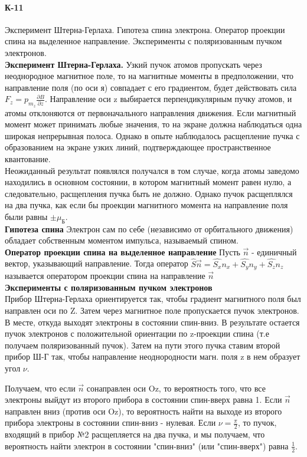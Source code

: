 \documentclass[__main__.tex]{subfiles}
\begin{document}
\paragraph{К-11} Эксперимент Штерна-Герлаха. Гипотеза спина электрона. Оператор проекции спина на выделенное направление. Эксперименты с поляризованным пучком электронов.\\

\textbf{Эксперимент Штерна-Герлаха.} Узкий пучок атомов пропускать через неоднородное магнитное поле, то на магнитные моменты в предположении, что направление поля (по оси я) совпадает с его градиентом, будет действовать сила $F_z = p_{m_z}\frac{\partial B}{\partial z}$. Направление оси z выбирается перпендикулярным пучку атомов, и атомы отклоняются от первоначального направления движения. Если магнитный момент может принимать любые значения, то на экране должна наблюдаться одна широкая непрерывная полоса. Однако в опыте наблюдалось расщепление пучка с образованием на экране узких линий, подтверждающее пространственное квантование. \\

Неожиданный результат появлялся получался в том случае, когда атомы заведомо находились в основном состоянии, в котором магнитный момент равен нулю, а следовательно, расщепления пучка быть не должно. Однако пучок расщеплялся на два пучка, как если бы проекции магнитного момента на направление поля были равны $\pm \mu_{Б}$. \\

\textbf{Гипотеза спина} Электрон сам по себе (независимо от орбитального движения) обладает собственным моментом импульса, называемый спином. \\

\textbf{Оператор проекции спина на выделенное направление} Пусть $\vec{n}$ - единичный вектор, указывающий направление. Тогда оператор $\hat{S}\vec{n} = \hat{S_x} n_x + \hat{S_y} n_y + \hat{S_z} n_z$ называется оператором проекции спина на направление $\vec{n}$\\

\textbf{Эксперименты с поляризованным пучком электронов} \\ Прибор Штерна-Герлаха ориентируется так, чтобы градиент магнитного поля был направлен оси по Z. Затем через магнитное поле пропускается пучок электронов. В месте, откуда выходят электроны в состоянии спин-вниз. В результате остается пучок электронов с положительной ориентации по z-проекции спина (т.е получаем поляризованный пучок). Затем на пути этого пучка ставим второй прибор Ш-Г так, чтобы направление неоднородности магн. поля z в нем образует угол $\nu$. 

Получаем, что если $\vec{n}$ сонаправлен оси Oz, то вероятность того, что все электроны выйдут из второго прибора в состоянии спин-вверх равна 1. Если $\vec{n}$ направлен вниз (против оси Oz), то вероятность найти на выходе из второго прибора электроны в состоянии спин-вниз - нулевая. Если $\nu = \frac{\pi}{2}$, то пучок, входящий в прибор №2 расщепляется на два пучка, и мы получаем, что вероятность найти электрон в состоянии "спин-вниз" (или "спин-вверх") равна $\frac{1}{2}$.
\end{document}
